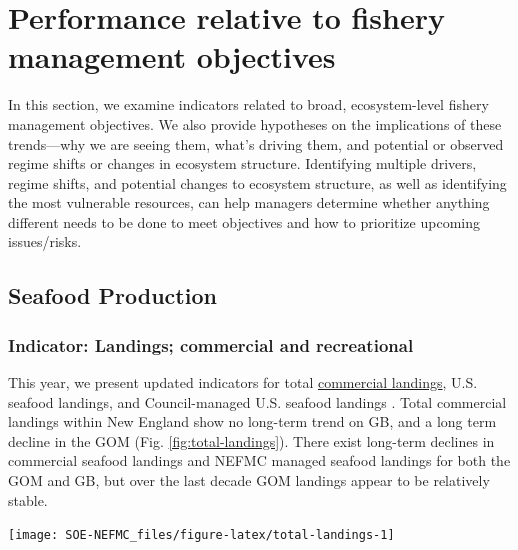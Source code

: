 \documentclass[
  10pt,
]{article}
\let\origfigure\figure
\let\endorigfigure\endfigure
\renewenvironment{figure}[1][2] {
    \expandafter\origfigure\expandafter[H]
} {
    \endorigfigure
}
\begin{document}
\hypertarget{performance-relative-to-fishery-management-objectives}{%
\section{Performance relative to fishery management objectives}\label{performance-relative-to-fishery-management-objectives}}

In this section, we examine indicators related to broad, ecosystem-level fishery management objectives. We also provide hypotheses on the implications of these trends---why we are seeing them, what's driving them, and potential or observed regime shifts or changes in ecosystem structure. Identifying multiple drivers, regime shifts, and potential changes to ecosystem structure, as well as identifying the most vulnerable resources, can help managers determine whether anything different needs to be done to meet objectives and how to prioritize upcoming issues/risks.

\hypertarget{seafood-production}{%
\subsection{Seafood Production}\label{seafood-production}}

\hypertarget{indicator-landings-commercial-and-recreational}{%
\subsubsection{Indicator: Landings; commercial and recreational}\label{indicator-landings-commercial-and-recreational}}

This year, we present updated indicators for total \href{https://noaa-edab.github.io/catalog/comdat.html}{commercial landings}, U.S. seafood landings, and Council-managed U.S. seafood landings . Total commercial landings within New England show no long-term trend on GB, and a long term decline in the GOM (Fig. \ref{fig:total-landings}). There exist long-term declines in commercial seafood landings and NEFMC managed seafood landings for both the GOM and GB, but over the last decade GOM landings appear to be relatively stable.

\begin{figure}

{\centering \texttt{[image: SOE-NEFMC\_files/figure-latex/total-landings-1]} 

}

\caption{Total commercial landings (black), total U.S. seafood landings (blue), and New England managed U.S. seafood landings (red) for Georges Bank (GB) and the Gulf of Maine (GOM).}\label{fig:total-landings}
\end{figure}
\end{document}
